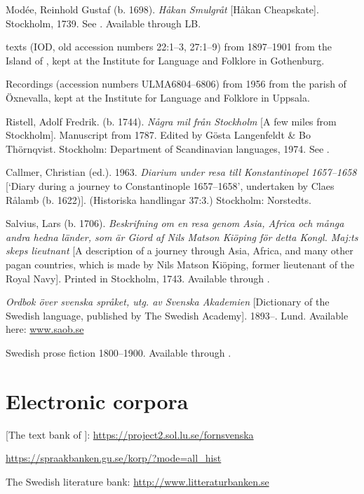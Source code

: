 \documentclass[output=paper]{langscibook}
\begin{document}
\begin{description}[font=\normalfont]
\item[Modée:] Modée, Reinhold Gustaf (b. 1698). \textit{Håkan Smulgråt} [Håkan Cheapskate]. Stockholm, 1739. See \citet{MarttalaStromquist2001}. Available through LB.
\item[\isi{Orust}:]  texts (IOD, old accession numbers 22:1–3, 27:1–9) from 1897–1901 from the Island of , kept at the Institute for Language and Folklore in Gothenburg.
\item[Öxn:] Recordings (accession numbers ULMA6804–6806) from 1956 from the parish of Öxnevalla, kept at the Institute for Language and Folklore in Uppsala.
\item[Ristell:] Ristell, Adolf Fredrik. (b. 1744). \textit{Några mil från Stockholm} [A few miles from Stockholm]. Manuscript from 1787. Edited by Gösta Langenfeldt \& Bo Thörnqvist. Stockholm: Department of Scandinavian languages, 1974. See \citet{MarttalaStromquist2001}.
\item[Rålamb:] Callmer, Christian (ed.). 1963. \textit{Diarium under resa till Konstantinopel 1657–1658} [`Diary during a journey to Constantinople 1657–1658’, undertaken by Claes Rålamb (b. 1622)]. (Historiska handlingar 37:3.) Stockholm: Norstedts.
\item[Salvius:] Salvius, Lars (b. 1706). \textit{Beskrifning om en resa genom Asia, Africa och många andra hedna länder, som är Giord af Nils Matson Kiöping för detta Kongl. Maj:ts skeps lieutnant} [A description of a journey through Asia, Africa, and many other pagan countries, which is made by Nils Matson Kiöping, former lieutenant of the Royal Navy]. Printed in Stockholm, 1743. Available through .
\item[\isi{SAOB}:] \textit{Ordbok över svenska språket, utg. av Svenska Akademien} [Dictionary of the Swedish language, published by The Swedish Academy]. 1893–. Lund. Available here: \href{http://www.saob.se}{{www.saob.se}}
\item[SPF:] Swedish prose fiction 1800–1900. Available through .
\end{description}

\section*{Electronic corpora}

\begin{description}[font=\normalfont]
\item[FTB:]  [The text bank of ]: \url{https://project2.sol.lu.se/fornsvenska} 
\item[\isi{Korp}:] \url{https://spraakbanken.gu.se/korp/?mode=all_hist}
\item[LB:] The Swedish literature bank: \url{http://www.litteraturbanken.se}
\end{description}

{\sloppy\printbibliography[heading=subbibliography,notkeyword=this]}
\end{document}
